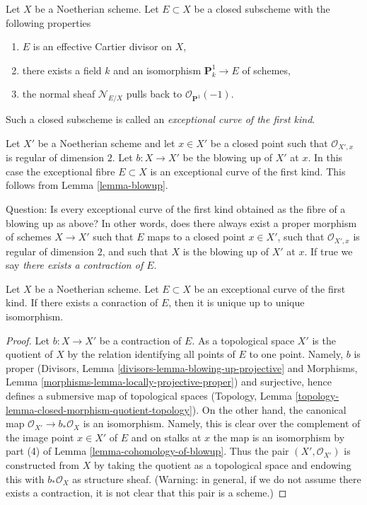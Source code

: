 \noindent
Let $X$ be a Noetherian scheme. Let $E \subset X$ be a closed
subscheme with the following properties
\begin{enumerate}
\item $E$ is an effective Cartier divisor on $X$,
\item there exists a field $k$ and an isomorphism $\mathbf{P}^1_k \to E$
of schemes,
\item the normal sheaf $\mathcal{N}_{E/X}$ pulls back to
$\mathcal{O}_{\mathbf{P}^1}(-1)$.
\end{enumerate}
Such a closed subscheme is called an {\it exceptional curve of the first kind}.

\medskip\noindent
Let $X'$ be a Noetherian scheme and let $x \in X'$ be a closed point
such that $\mathcal{O}_{X', x}$ is regular of dimension $2$. Let
$b : X \to X'$ be the blowing up of $X'$ at $x$. In this case the
exceptional fibre $E \subset X$ is an exceptional curve of the first
kind. This follows from Lemma \ref{lemma-blowup}.

\medskip\noindent
Question: Is every exceptional curve of the first kind obtained
as the fibre of a blowing up as above? In other words, does there
always exist a proper morphism of schemes $X \to X'$ such that
$E$ maps to a closed point $x \in X'$, such that $\mathcal{O}_{X', x}$
is regular of dimension $2$, and such that $X$ is the blowing up
of $X'$ at $x$. If true we say {\it there exists a contraction of $E$}.

\begin{lemma}
\label{lemma-contraction-unique}
Let $X$ be a Noetherian scheme. Let $E \subset X$ be an
exceptional curve of the first kind. If there exists a conraction
of $E$, then it is unique up to unique isomorphism.
\end{lemma}

\begin{proof}
Let $b : X \to X'$ be a contraction of $E$. As a topological space
$X'$ is the quotient of $X$ by the relation identifying all points
of $E$ to one point. Namely, $b$ is proper
(Divisors, Lemma \ref{divisors-lemma-blowing-up-projective} and
Morphisms, Lemma \ref{morphisms-lemma-locally-projective-proper})
and surjective, hence defines a submersive map of topological
spaces (Topology, Lemma
\ref{topology-lemma-closed-morphism-quotient-topology}).
On the other hand, the canonical map
$\mathcal{O}_{X'} \to b_*\mathcal{O}_X$ is an isomorphism. Namely,
this is clear over the complement of the image point $x \in X'$ of $E$
and on stalks at $x$ the map is an isomorphism by part (4) of
Lemma \ref{lemma-cohomology-of-blowup}.
Thus the pair $(X', \mathcal{O}_{X'})$ is constructed
from $X$ by taking the quotient as a topological space
and endowing this with $b_*\mathcal{O}_X$ as structure sheaf.
(Warning: in general, if we do not assume there exists a contraction,
it is not clear that this pair is a scheme.)
\end{proof}

